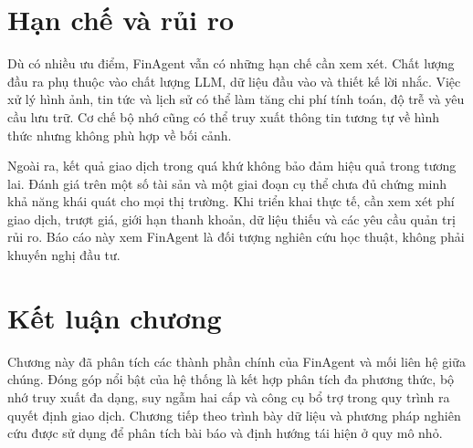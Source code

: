 \section{Hạn chế và rủi ro}

Dù có nhiều ưu điểm, FinAgent vẫn có những hạn chế cần xem xét. Chất lượng đầu ra phụ thuộc vào chất lượng LLM, dữ liệu đầu vào và thiết kế lời nhắc. Việc xử lý hình ảnh, tin tức và lịch sử có thể làm tăng chi phí tính toán, độ trễ và yêu cầu lưu trữ. Cơ chế bộ nhớ cũng có thể truy xuất thông tin tương tự về hình thức nhưng không phù hợp về bối cảnh.

Ngoài ra, kết quả giao dịch trong quá khứ không bảo đảm hiệu quả trong tương lai. Đánh giá trên một số tài sản và một giai đoạn cụ thể chưa đủ chứng minh khả năng khái quát cho mọi thị trường. Khi triển khai thực tế, cần xem xét phí giao dịch, trượt giá, giới hạn thanh khoản, dữ liệu thiếu và các yêu cầu quản trị rủi ro. Báo cáo này xem FinAgent là đối tượng nghiên cứu học thuật, không phải khuyến nghị đầu tư.

\section{Kết luận chương}
Chương này đã phân tích các thành phần chính của FinAgent và mối liên hệ giữa chúng. Đóng góp nổi bật của hệ thống là kết hợp phân tích đa phương thức, bộ nhớ truy xuất đa dạng, suy ngẫm hai cấp và công cụ bổ trợ trong quy trình ra quyết định giao dịch. Chương tiếp theo trình bày dữ liệu và phương pháp nghiên cứu được sử dụng để phân tích bài báo và định hướng tái hiện ở quy mô nhỏ.
